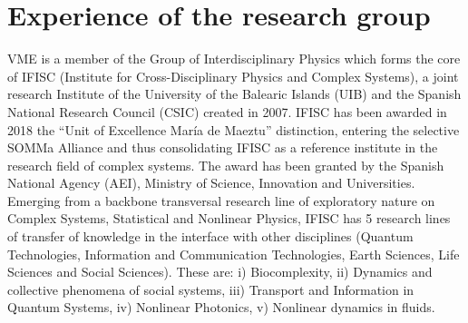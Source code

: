 \documentclass[authoryear,1p,12pt]{elsarticle}
\begin{document}
    
     
     \newpage
     \section{Experience of the research group}
     VME is a member of the Group of Interdisciplinary Physics which
     forms the core of IFISC (Institute for Cross-Disciplinary Physics
     and Complex Systems), a joint research Institute of the
     University of the Balearic Islands (UIB) and the Spanish National
     Research Council (CSIC) created in 2007. IFISC has been awarded
     in 2018 the “Unit of Excellence María de Maeztu” distinction,
     entering the selective SOMMa Alliance and thus consolidating
     IFISC as a reference institute in the research field of complex
     systems. The award has been granted by the Spanish National
     Agency (AEI), Ministry of Science, Innovation and
     Universities. Emerging from a backbone transversal research line
     of exploratory nature on Complex Systems, Statistical and
     Nonlinear Physics, IFISC has 5 research lines of transfer of
     knowledge in the interface with other disciplines (Quantum
     Technologies, Information and Communication Technologies, Earth
     Sciences, Life Sciences and Social Sciences). These are: i)
     Biocomplexity, ii) Dynamics and collective phenomena of social
     systems, iii) Transport and Information in Quantum Systems, iv)
     Nonlinear Photonics, v) Nonlinear dynamics in fluids.
\end{document}
